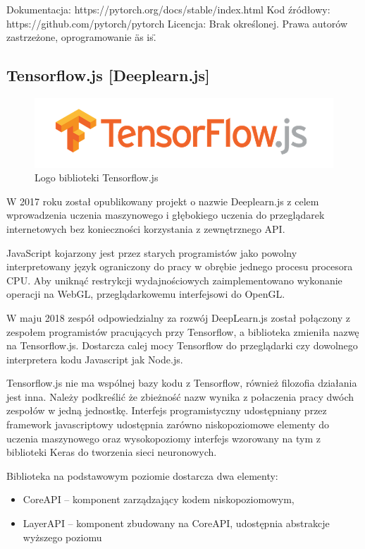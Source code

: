 \documentclass[12pt,a4paper,twoside,titlepage,openright]{book}
\begin{document}
\noindent
\newline
Dokumentacja: https://pytorch.org/docs/stable/index.html
\newline
Kod źródłowy: https://github.com/pytorch/pytorch
\newline
Licencja: Brak określonej. Prawa autorów zastrzeżone, oprogramowanie \"as is\".


\subsection{Tensorflow.js [Deeplearn.js]}
\begin{figure}[h]
	\centering
			\includegraphics[resolution=100, scale=0.5]{TensorflowJS.png}
		\caption{Logo biblioteki Tensorflow.js}
\end{figure}

W 2017 roku został opublikowany projekt o nazwie Deeplearn.js z celem wprowadzenia uczenia maszynowego i głębokiego uczenia do przeglądarek internetowych bez konieczności korzystania z zewnętrznego API. 

JavaScript kojarzony jest przez starych programistów jako powolny interpretowany język ograniczony do pracy w obrębie jednego procesu procesora CPU. Aby uniknąć restrykcji wydajnościowych zaimplementowano wykonanie operacji na WebGL, przeglądarkowemu interfejsowi do OpenGL.

W maju 2018 zespół odpowiedzialny za rozwój DeepLearn.js został połączony z zespołem programistów pracujących przy Tensorflow, a biblioteka zmieniła nazwę na Tensorflow.js. Dostarcza calej mocy Tensorflow do przeglądarki czy dowolnego interpretera kodu Javascript jak Node.js.

Tensorflow.js nie ma wspólnej bazy kodu z Tensorflow, również filozofia działania jest inna. Należy podkreślić że zbieżność nazw wynika z połaczenia pracy dwóch zespołów w jedną jednostkę. Interfejs programistyczny udostępniany przez framework javascriptowy udostępnia zarówno niskopoziomowe elementy do uczenia maszynowego oraz wysokopoziomy interfejs wzorowany na tym z biblioteki Keras do tworzenia sieci neuronowych.

Biblioteka na podstawowym poziomie dostarcza dwa elementy:
\begin{itemize}
\item CoreAPI -- komponent zarządzający kodem niskopoziomowym,
\item LayerAPI -- komponent zbudowany na CoreAPI, udostępnia abstrakcje wyższego poziomu
\end{itemize}
\end{document}
